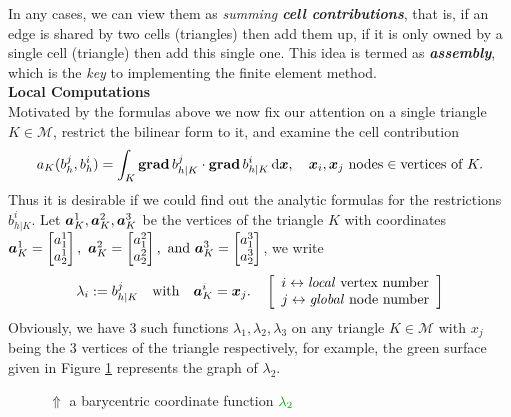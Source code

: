	In any cases, we can view them as 
	\emph{summing \textbf{cell contributions}}, 
	that is, if an edge is shared by two cells (triangles) then add them up, 
	if it is only owned by a single cell (triangle) then add this single one. 
	This idea is termed as \emph{\textbf{assembly}}, which is the \emph{key}
	to implementing the finite element method.\\
	
	\noindent\textbf{Local Computations}\\[8pt]
	Motivated by the formulas above we now fix our attention on a single 
	triangle $K\in\mathcal{M}$, restrict the bilinear form to it, and examine 
	the	cell contribution
	\begin{equation}
	a_K(b_h^j,b_h^i)=\int_K\mathbf{grad}\, b_{h|K}^j\cdot\mathbf{grad}\, b_{h|K}^i\, \mathrm{d}\bm{x},\quad
		\bm{x}_i,\bm{x}_j \ \textrm{nodes}\in\textrm{vertices of }K.
	\end{equation}
	Thus it is desirable if we could find out the analytic formulas for the 
	restrictions $b_{h|K}^i$. Let $\bm{a}_K^1,\bm{a}_K^2,\bm{a}_K^3$ be the vertices of 
	the	triangle $K$ with coordinates $
	\ba_K^1=\begin{bmatrix}a^1_1\\a^1_2\end{bmatrix},\ 
	\ba_K^2=\begin{bmatrix}a^2_1\\a^2_2\end{bmatrix},\ \textrm{and }
	\ba_K^3=\begin{bmatrix}a^3_1\\a^3_2\end{bmatrix}$, we write
	\begin{equation}\label{def:baraycentric coordinate function}
	\lambda_i:=b_{h|K}^j \quad \textrm{with} \quad \bm{a}_K^i=\bm{x}_j. \quad 
	\left[\begin{array}{l}
	i \leftrightarrow \textrm{\emph{local} vertex number}\\
	j \leftrightarrow \textrm{\emph{global} node number}	
	\end{array}\right]
	\end{equation}
	Obviously, we have 3 such functions $\lambda_1,\lambda_2,\lambda_3$
	on any triangle $K\in\mathcal{M}$ with $x_j$ being the 3 vertices 
	of the triangle respectively, for example, the \textcolor{mid-green}{green} 
	surface given in Figure \ref{tikz:2D_barycentric_coordinate_function} 
	represents the graph of $\lambda_2$.
	\begin{figure}[!htbp]
		\centering
		
		\caption{$\Uparrow$ a barycentric coordinate function 
			$\textcolor{mid-green}{\lambda_2}$}
		\label{tikz:2D_barycentric_coordinate_function}
	\end{figure}
	
